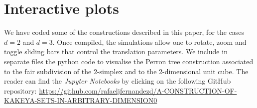 \documentclass[10pt]{amsart}
\begin{document}
\section{Interactive plots}
We have coded some of the constructions described in this paper, for the cases $d=2$ and $d=3$. Once compiled, the simulations allow one to rotate, zoom and toggle sliding bars that control the translation parameters. We include in separate files the python code to visualise the Perron tree construction associated to the fair subdivision of the $2$-simplex and to the 2-dimensional unit cube. The reader can find the \textit{Jupyter Notebooks} by clicking on the following GitHub repository:
\newline \url{https://github.com/rafaeljfernandezd/A-CONSTRUCTION-OF-KAKEYA-SETS-IN-ARBITRARY-DIMENSION0}
\end{document}

